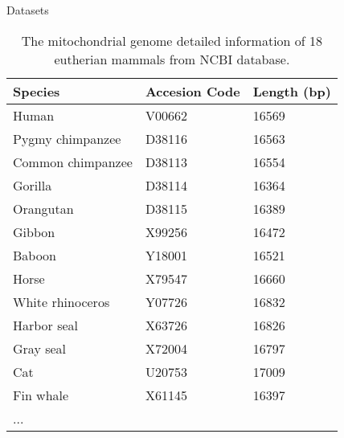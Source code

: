 \documentclass[10pt]{beamer}
\newcommand{\1}{
	\setbeamertemplate{background}{
		\texttt{[image: img/1]}
		\tikz[overlay] \fill[fill opacity=0.75,fill=white] (0,0) rectangle (-\paperwidth,\paperheight);
	}
}
\begin{document}
\begin{frame}{Datasets}
\begin{table}[]
	\centering
	\caption{The mitochondrial genome detailed information of 18 eutherian mammals from
		NCBI database.}
	\label{tab:mitocondrialdb}
	\begin{tabular}{lll}
		\hline
		Species           & Accesion Code & Length (bp) \\ \hline
		Human             & V00662        & 16569       \\
		Pygmy chimpanzee  & D38116        & 16563       \\
		Common chimpanzee & D38113        & 16554       \\
		Gorilla           & D38114        & 16364       \\
		Orangutan         & D38115        & 16389       \\
		Gibbon            & X99256        & 16472       \\
		Baboon            & Y18001        & 16521       \\
		Horse             & X79547        & 16660       \\
		White rhinoceros  & Y07726        & 16832       \\
		Harbor seal       & X63726        & 16826       \\
		Gray seal         & X72004        & 16797       \\
		Cat               & U20753        & 17009       \\
		Fin whale         & X61145        & 16397       \\
		... & & \\
	\end{tabular}
\end{table}
\end{frame}
\end{document}
